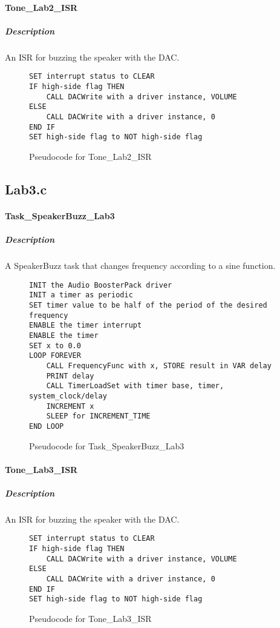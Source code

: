 \documentclass[titlepage]{article}
\begin{document}
\paragraph{Tone\_Lab2\_ISR}

\subparagraph{Description}
An ISR for buzzing the speaker with the DAC.

\begin{figure}[H]
    \begin{verbatim}
SET interrupt status to CLEAR
IF high-side flag THEN
    CALL DACWrite with a driver instance, VOLUME
ELSE
    CALL DACWrite with a driver instance, 0
END IF
SET high-side flag to NOT high-side flag
    \end{verbatim}
    \caption{Pseudocode for Tone\_Lab2\_ISR}
\end{figure}


\subsection{Lab3.c}

\paragraph{Task\_SpeakerBuzz\_Lab3}

\subparagraph{Description}
A SpeakerBuzz task that changes frequency according to a sine function.

\begin{figure}[H]
    \begin{verbatim}
INIT the Audio BoosterPack driver
INIT a timer as periodic
SET timer value to be half of the period of the desired frequency
ENABLE the timer interrupt
ENABLE the timer
SET x to 0.0
LOOP FOREVER
    CALL FrequencyFunc with x, STORE result in VAR delay
    PRINT delay
    CALL TimerLoadSet with timer base, timer, system_clock/delay
    INCREMENT x
    SLEEP for INCREMENT_TIME
END LOOP
    \end{verbatim}
    \caption{Pseudocode for Task\_SpeakerBuzz\_Lab3}
\end{figure}

\paragraph{Tone\_Lab3\_ISR}

\subparagraph{Description}
An ISR for buzzing the speaker with the DAC.

\begin{figure}[H]
    \begin{verbatim}
SET interrupt status to CLEAR
IF high-side flag THEN
    CALL DACWrite with a driver instance, VOLUME
ELSE
    CALL DACWrite with a driver instance, 0
END IF
SET high-side flag to NOT high-side flag
    \end{verbatim}
    \caption{Pseudocode for Tone\_Lab3\_ISR}
\end{figure}
\end{document}
